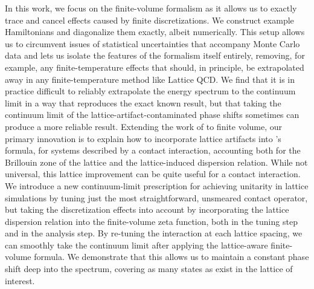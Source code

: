 {In this work, we focus on the \Luscher finite-volume formalism as it allows us to exactly trace and cancel effects caused by finite discretizations.
We construct example Hamiltonians and diagonalize them exactly, albeit numerically.
This setup allows us to circumvent issues of statistical uncertainties that accompany Monte Carlo data and lets us isolate the features of the formalism itself entirely, removing, for example, any finite-temperature effects that should, in principle, be extrapolated away in any finite-temperature method like Lattice QCD.
We find that it is in practice difficult to reliably extrapolate the energy spectrum to the continuum limit in a way that reproduces the exact known result, but that taking the continuum limit of the lattice-artifact-contaminated phase shifts sometimes can produce a more reliable result.
Extending the work of  to finite volume, our primary innovation is to explain how to incorporate lattice artifacts into \Luscher's formula, for systems described by a contact interaction, accounting both for the Brillouin zone of the lattice and the lattice-induced dispersion relation.
While not universal, this lattice improvement can be quite useful for a contact interaction.
We introduce a new continuum-limit prescription for achieving unitarity in lattice simulations by tuning just the most straightforward, unsmeared contact operator, but taking the discretization effects into account by incorporating the lattice dispersion relation into the finite-volume zeta function, both in the tuning step and in the analysis step.
By re-tuning the interaction at each lattice spacing, we can smoothly take the continuum limit after applying the lattice-aware finite-volume formula.
We demonstrate that this allows us to maintain a constant phase shift deep into the spectrum, covering as many \Aoneg states as exist in the lattice of interest.

}
